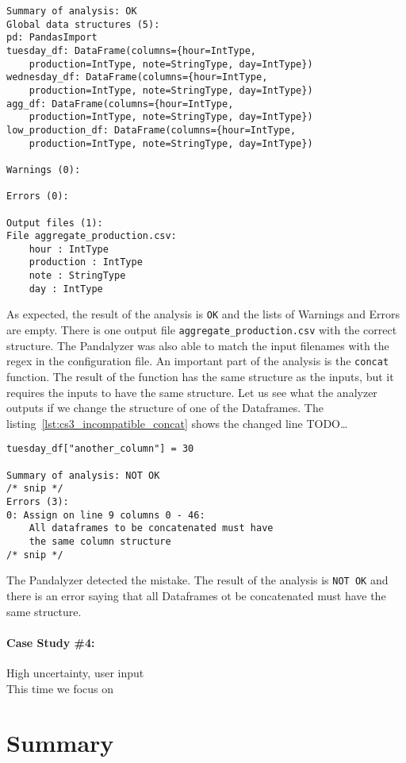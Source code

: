 \begin{lstlisting}[caption=Analysis output of the third case study, label={lst:cs3_analysis_output}, captionpos=b]
Summary of analysis: OK
Global data structures (5):
pd: PandasImport
tuesday_df: DataFrame(columns={hour=IntType,
    production=IntType, note=StringType, day=IntType})
wednesday_df: DataFrame(columns={hour=IntType,
    production=IntType, note=StringType, day=IntType})
agg_df: DataFrame(columns={hour=IntType,
    production=IntType, note=StringType, day=IntType})
low_production_df: DataFrame(columns={hour=IntType,
    production=IntType, note=StringType, day=IntType})

Warnings (0):

Errors (0):

Output files (1):
File aggregate_production.csv:
    hour : IntType
    production : IntType
    note : StringType
    day : IntType
\end{lstlisting}

As expected, the result of the analysis is \verb|OK| and the lists of Warnings and Errors are empty.
There is one output file \verb|aggregate_production.csv| with the correct structure.
The Pandalyzer was also able to match the input filenames with the regex in the configuration file.
An important part of the analysis is the \verb|concat| function.
The result of the function has the same structure as the inputs, but it requires the inputs to have the same structure.
Let us see what the analyzer outputs if we change the structure of one of the Dataframes.
The listing~\ref{lst:cs3_incompatible_concat} shows the changed line TODO\ldots

\begin{lstlisting}[caption=Incompatible Dataframes to concat operation and analysis output, label={lst:cs3_incompatible_concat}, captionpos=b]
tuesday_df["another_column"] = 30

Summary of analysis: NOT OK
/* snip */
Errors (3):
0: Assign on line 9 columns 0 - 46:
    All dataframes to be concatenated must have
    the same column structure
/* snip */
\end{lstlisting}

The Pandalyzer detected the mistake.
The result of the analysis is \verb|NOT OK| and there is an error saying that all Dataframes ot be concatenated must
have the same structure.


\paragraph{Case Study \#4:} High uncertainty, user input \\
This time we focus on


\section*{Summary}
